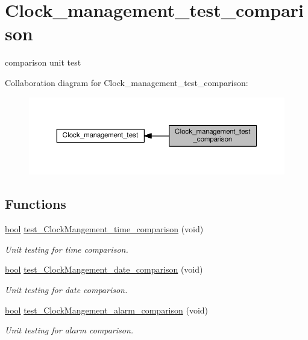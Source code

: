 \hypertarget{group__clock__management__test__comparison}{}\section{Clock\+\_\+management\+\_\+test\+\_\+comparison}
\label{group__clock__management__test__comparison}


comparison unit test  


Collaboration diagram for Clock\+\_\+management\+\_\+test\+\_\+comparison\+:\nopagebreak
\begin{figure}[H]
\begin{center}
\leavevmode
\includegraphics[width=350pt]{d1/da8/group__clock__management__test__comparison}
\end{center}
\end{figure}
\subsection*{Functions}
\begin{DoxyCompactItemize}
\item 
\hyperlink{group___utils_gaf6a258d8f3ee5206d682d799316314b1}{bool} \hyperlink{group__clock__management__test__comparison_gaee6cb57486595cb01fabd83a761cc5bd}{test\+\_\+\+Clock\+Mangement\+\_\+time\+\_\+comparison} (void)
\begin{DoxyCompactList}\small\item\em Unit testing for time comparison. \end{DoxyCompactList}\item 
\hyperlink{group___utils_gaf6a258d8f3ee5206d682d799316314b1}{bool} \hyperlink{group__clock__management__test__comparison_ga654df72e52579be8b193aeaf4f029ff3}{test\+\_\+\+Clock\+Mangement\+\_\+date\+\_\+comparison} (void)
\begin{DoxyCompactList}\small\item\em Unit testing for date comparison. \end{DoxyCompactList}\item 
\hyperlink{group___utils_gaf6a258d8f3ee5206d682d799316314b1}{bool} \hyperlink{group__clock__management__test__comparison_gac319e1ba8c6efa413c8e8c05113094a0}{test\+\_\+\+Clock\+Mangement\+\_\+alarm\+\_\+comparison} (void)
\begin{DoxyCompactList}\small\item\em Unit testing for alarm comparison. \end{DoxyCompactList}\end{DoxyCompactItemize}


